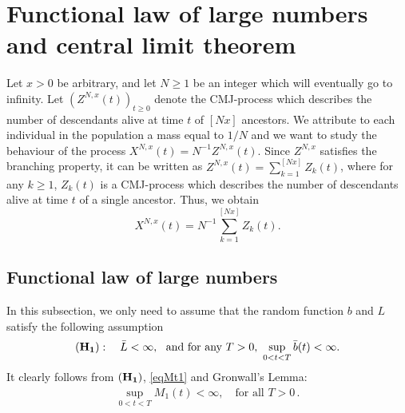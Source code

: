 \documentclass[11pt]{article}
\def\E{{\mathbb E}}
\def\L {\bar{L}}
\newtheorem{proposition}[theorem]{Proposition}
\newenvironment{proof}[1][Proof.]{\textbf{#1} }{\hfill $\blacksquare$}
\begin{document}


\section{Functional law of large numbers and central limit theorem}
Let $x>0$ be arbitrary, and let $N\geqslant1$ be an integer which will eventually go to infinity. Let $(Z^{N,x}(t))_{t\geq 0}$ denote the CMJ-process which describes the number of descendants alive at time $t$ of $[Nx]$ ancestors. We attribute to each individual in the population a mass equal to $1/N$ and we want to study the behaviour of the process $X^{N,x}(t)= N^{-1}Z^{N,x}(t)$. Since $Z^{N,x}$ satisfies the branching property, it can be written as $Z^{N,x}(t)= \sum_{k=1}^{[Nx]} Z_k(t)$, where for any $k\ge 1$, $Z_k(t)$ is a CMJ-process which describes the number of descendants alive at time $t$ of a single ancestor. Thus, we obtain 
\begin{equation} \label{eqXNxt1} 
X^{N,x}(t)= N^{-1} \sum_{k=1}^{[Nx]} Z_k(t). 
\end{equation} 
\subsection{Functional law of large numbers}
In this subsection, we only need to assume that the random function $b$ and $L$ satisfy the following assumption
\begin{equation*}
{(\bf H_1)}  :  \quad  \L<\infty,\ \text{ and for any} \ T>0, \  \sup_{0<t<T} \bar{b}(t)<\infty.
\end{equation*} 
It clearly follows from ${(\bf H_1)}$, \eqref{eqMt1} and Gronwall's Lemma: 
 \begin{align}\label{M1estim}
\sup_{0<t<T} M_1(t)<\infty,\quad\text{for all }T>0\,.
\end{align} 
  
\end{document}

